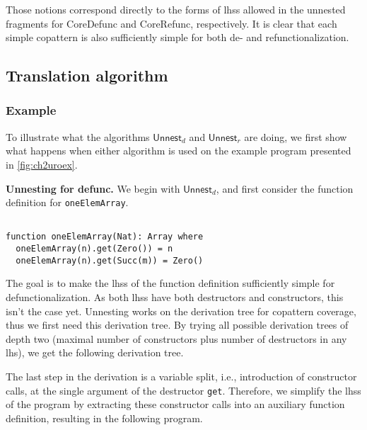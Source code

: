 Those notions correspond directly to the forms of lhss allowed in the unnested fragments for \textsf{CoreDefunc} and \textsf{CoreRefunc}, respectively. It is clear that each simple copattern is also sufficiently simple for both de- and refunctionalization.

\subsection{Translation algorithm}
\label{ssec:unntransl}

\subsubsection{Example}

To illustrate what the algorithms $\textsf{Unnest}_d$ and $\textsf{Unnest}_r$ are doing, we first show what happens when either algorithm is used on the example program presented in \autoref{fig:ch2uroex}.

\textbf{Unnesting for defunc.} We begin with $\textsf{Unnest}_d$, and first consider the function definition for \texttt{oneElemArray}.

\begin{lstlisting}

function oneElemArray(Nat): Array where
  oneElemArray(n).get(Zero()) = n
  oneElemArray(n).get(Succ(m)) = Zero()

\end{lstlisting}

The goal is to make the lhss of the function definition sufficiently simple for defunctionalization. As both lhss have both destructors and constructors, this isn't the case yet. Unnesting works on the derivation tree for copattern coverage, thus we first need this derivation tree. By trying all possible derivation trees of depth two (maximal number of constructors plus number of destructors in any lhs), we get the following derivation tree.

\begin{prooftree}
\end{prooftree}

The last step in the derivation is a variable split, i.e., introduction of constructor calls, at the single argument of the destructor \texttt{get}. Therefore, we simplify the lhss of the program by extracting these constructor calls into an auxiliary function definition, resulting in the following program.

